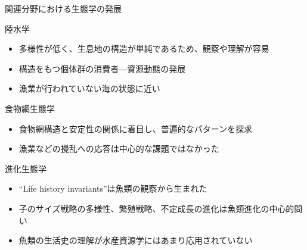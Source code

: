 \documentclass[
  ignorenonframetext,
]{beamer}
\providecommand{\tightlist}{%
  \setlength{\itemsep}{0pt}\setlength{\parskip}{0pt}}
\begin{document}
\begin{frame}{関連分野における生態学の発展}
\protect\hypertarget{ux95a2ux9023ux5206ux91ceux306bux304aux3051ux308bux751fux614bux5b66ux306eux767aux5c55}{}

\begin{block}{陸水学}

\begin{itemize}
\tightlist
\item
  多様性が低く、生息地の構造が単純であるため、観察や理解が容易
\item
  構造をもつ個体群の消費者―資源動態の発展
\item
  漁業が行われていない海の状態に近い\pause
\end{itemize}

\end{block}

\begin{block}{食物網生態学}

\begin{itemize}
\tightlist
\item
  食物網構造と安定性の関係に着目し、普遍的なパターンを探求
\item
  漁業などの攪乱への応答は中心的な課題ではなかった\pause  
\end{itemize}

\end{block}

\begin{block}{進化生態学}

\begin{itemize}
\tightlist
\item
  ``Life history invariants''は魚類の観察から生まれた
\item
  子のサイズ戦略の多様性、繁殖戦略、不定成長の進化は魚類進化の中心的問い
\item
  魚類の生活史の理解が水産資源学にはあまり応用されていない
\end{itemize}

\end{block}

\end{frame}
\end{document}
